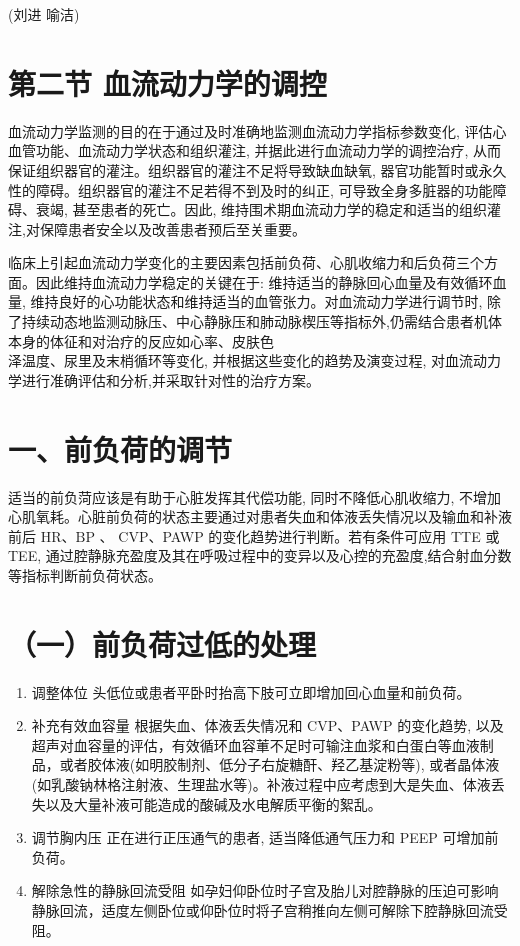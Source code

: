 \documentclass[10pt]{article}
\begin{document}
(刘进 喻洁)

\section*{第二节 血流动力学的调控}
血流动力学监测的目的在于通过及时准确地监测血流动力学指标参数变化, 评估心血管功能、血流动力学状态和组织灌注, 并据此进行血流动力学的调控治疗, 从而保证组织器官的灌注。组织器官的灌注不足将导致缺血缺氧, 器官功能暂时或永久性的障碍。组织器官的灌注不足若得不到及时的纠正, 可导致全身多脏器的功能障碍、衰竭, 甚至患者的死亡。因此, 维持围术期血流动力学的稳定和适当的组织灌注,对保障患者安全以及改善患者预后至关重要。

临床上引起血流动力学变化的主要因素包括前负荷、心肌收缩力和后负荷三个方面。因此维持血流动力学稳定的关键在于: 维持适当的静脉回心血量及有效循环血量, 维持良好的心功能状态和维持适当的血管张力。对血流动力学进行调节时, 除了持续动态地监测动脉压、中心静脉压和肺动脉楔压等指标外,仍需结合患者机体本身的体征和对治疗的反应如心率、皮肤色\\
泽温度、尿里及末梢循环等变化, 并根据这些变化的趋势及演变过程, 对血流动力学进行准确评估和分析,并采取针对性的治疗方案。

\section*{一、前负荷的调节}
适当的前负菏应该是有助于心脏发挥其代偿功能, 同时不降低心肌收缩力, 不增加心肌氧耗。心脏前负荷的状态主要通过对患者失血和体液丢失情况以及输血和补液前后 $\mathrm{HR} 、 \mathrm{BP}$ 、 CVP、PAWP 的变化趋势进行判断。若有条件可应用 TTE 或 TEE, 通过腔静脉充盈度及其在呼吸过程中的变异以及心控的充盈度,结合射血分数等指标判断前负荷状态。

\section*{（一）前负荷过低的处理}
\begin{enumerate}
  \item 调整体位 头低位或患者平卧时抬高下肢可立即增加回心血量和前负荷。

  \item 补充有效血容量 根据失血、体液丢失情况和 CVP、PAWP 的变化趋势, 以及超声对血容量的评估，有效循环血容莗不足时可输注血浆和白蛋白等血液制品，或者胶体液(如明胶制剂、低分子右旋糖酐、羟乙基淀粉等), 或者晶体液(如乳酸钠林格注射液、生理盐水等)。补液过程中应考虑到大是失血、体液丢失以及大量补液可能造成的酸碱及水电解质平衡的絮乱。

  \item 调节胸内压 正在进行正压通气的患者, 适当降低通气压力和 PEEP 可增加前负荷。

  \item 解除急性的静脉回流受阻 如孕妇仰卧位时子宫及胎儿对腔静脉的压迫可影响静脉回流，适度左侧卧位或仰卧位时将子宫稍推向左侧可解除下腔静脉回流受阻。

\end{enumerate}
\end{document}
